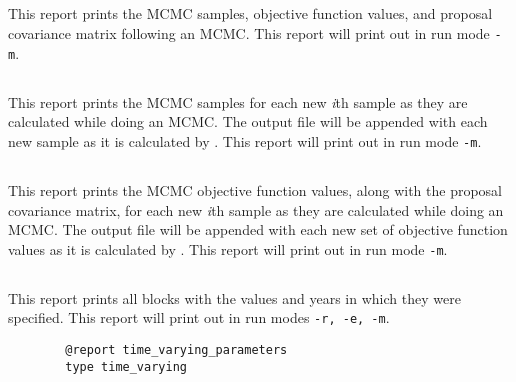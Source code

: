 \subsection{}\label{sec:Report-MCMC}

This report prints the MCMC samples, objective function values, and proposal covariance matrix following an MCMC. This report will print out in run mode \texttt{-m}.

\subsection{}\label{sec:Report-MCMCSample}

This report prints the MCMC samples for each new \textit{i}th sample as they are calculated while doing an MCMC. The output file will be appended with each new sample as it is calculated by \CNAME. This report will print out in run mode \texttt{-m}.

\subsection{}\label{sec:Report-MCMCObjective}

This report prints the MCMC objective function values, along with the proposal covariance matrix, for each new \textit{i}th sample as they are calculated while doing an MCMC. The output file will be appended with each new set of objective function values as it is calculated by \CNAME. This report will print out in run mode \texttt{-m}.

\subsection{}\label{sec:Report-TimeVarying}

This report prints all  blocks with the values and years in which they were specified. This report will print out in run modes \texttt{-r, -e, -m}.

{\small{\begin{verbatim}
		@report time_varying_parameters
		type time_varying
		\end{verbatim}}}

\subsection{}\label{sec:Tabular}

